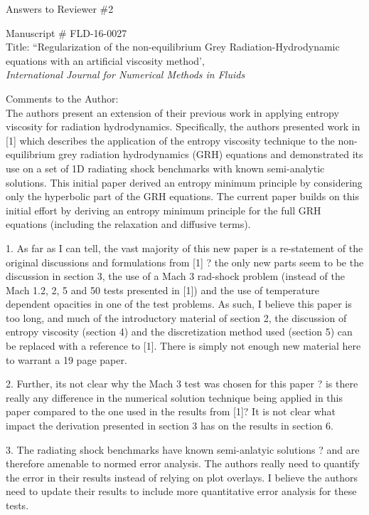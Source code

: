 \documentclass{article}
\begin{document}
\begin{center}
{ \Large Answers to Reviewer \#2}
\end{center}

\bigskip

\noindent Manuscript \# FLD-16-0027 \\
Title: ``Regularization of the non-equilibrium Grey Radiation-Hydrodynamic equations with an artificial viscosity method', \\
{\it International Journal for Numerical Methods in Fluids}\\

\bigskip
\bigskip

{\color{blue}
Comments to the Author: \\ 
The authors present an extension of their previous work in applying entropy viscosity for radiation hydrodynamics. Specifically, the authors presented work in [1] which describes the application of the entropy viscosity technique to the non-equilibrium grey radiation hydrodynamics (GRH) equations and demonstrated its use on a set of 1D radiating shock benchmarks with known semi-analytic solutions. This initial paper derived an entropy minimum principle by considering only the hyperbolic part of the GRH equations. The current paper builds on this initial effort by deriving an entropy minimum principle for the full GRH equations (including the relaxation and diffusive terms).\\}

\bigskip

{\color{blue}
1. As far as I can tell, the vast majority of this new paper is a re-statement of the original discussions and formulations from [1] ? the only new parts seem to be the discussion in section 3, the use of a Mach 3 rad-shock problem (instead of the Mach 1.2, 2, 5 and 50 tests presented in [1]) and the use of temperature dependent opacities in one of the test problems. As such, I believe this paper is too long, and much of the introductory material of section 2, the discussion of entropy viscosity (section 4) and the discretization method used (section 5) can be replaced with a reference to [1]. There is simply not enough new material here to warrant a 19 page paper. \\}

\bigskip

{\color{blue}
2. Further, its not clear why the Mach 3 test was chosen for this paper ? is there really any difference in the numerical solution technique being applied in this paper compared to the one used in the results from [1]? It is not clear what impact the derivation presented in section 3 has on the results in section 6.\\}

\bigskip

{\color{blue}
3. 
The radiating shock benchmarks have known semi-anlatyic solutions ? and are therefore amenable to normed error analysis. The authors really need to quantify the error in their results instead of relying on plot overlays. I believe the authors need to update their results to include more quantitative error analysis for these tests.
\\}

\bigskip
\end{document}
